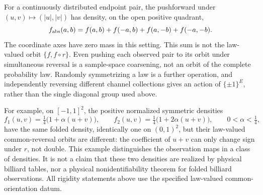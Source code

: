 \begin{remark}
\label{rem:v28-folded-records}
For a continuously distributed endpoint pair, the pushforward under
\((u,v)\mapsto(|u|,|v|)\) has density, on the open positive quadrant,
\begin{equation}\label{eq:v28-folded-density}
 f_{\rm abs}(a,b)=f(a,b)+f(-a,b)+f(a,-b)+f(-a,-b).
\end{equation}
The coordinate axes have zero mass in this setting.  This sum is not the
law-valued orbit \(\{f,f\circ r\}\).  Even pushing each observed pair to its
orbit under simultaneous reversal is a sample-space coarsening, not an orbit
of the complete probability law.  Randomly symmetrizing a law is a further
operation, and independently reversing different channel collections gives
an action of \(\{\pm1\}^{E}\), rather than the single diagonal group used
above.

For example, on \([-1,1]^2\), the positive normalized symmetric densities
\[
 f_1(u,v)=\tfrac14\bigl(1+\alpha(u+v)\bigr),\qquad
 f_2(u,v)=\tfrac14\bigl(1+2\alpha(u+v)\bigr),
 \qquad 0<\alpha<\tfrac14,
\]
have the same folded density, identically one on \((0,1)^2\), but their
law-valued common-reversal orbits are different: the coefficient of \(u+v\)
can only change sign under \(r\), not double.  This example distinguishes
the observation maps in a class of densities.  It is not a claim that these
two densities are realized by physical billiard tables, nor a physical
nonidentifiability theorem for folded billiard observations.  All rigidity
statements above use the specified law-valued common-orientation datum.
\end{remark}
